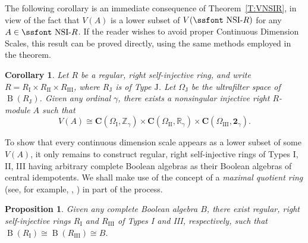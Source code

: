 \documentclass[psamsfonts,reqno]{memo-l}
\theoremstyle{plain}
\newtheorem{proposition}[lemma]{Proposition}
\newtheorem{corollary}[lemma]{Corollary}
\theoremstyle{definition}
\theoremstyle{remark}
\numberwithin{equation}{section}
\newcommand{\two}{\mathbf{2}}
\newcommand{\CC}{\mathbf{C}}
\DeclareMathOperator{\rB}{B}
\newcommand{\I}{\mathrm{I}}
\newcommand{\II}{\mathrm{II}}
\newcommand{\III}{\mathrm{III}}
\newcommand{\ZZ}{\mathbb{Z}}
\newcommand{\RR}{\mathbb{R}}
\newcommand{\J}{\mathrm{J}}
\newcommand{\NSIR}{\mbox{\ssfont NSI-}R}
\begin{document}
The following corollary is an immediate consequence of
Theorem~\ref{T:VNSIR}, in view of the fact that $V(A)$
is a lower subset of
$V(\NSIR)$ for any $A\in\NSIR$. If the reader wishes to avoid proper
Continuous Dimension Scales, this result can be proved directly, using
the same methods employed in the theorem.

\begin{corollary}\label{C:VNSIR}
Let $R$ be a regular, right self-injective ring,
%
and write $R= R_{\I}\times R_{\II}\times R_{\III}$, where $R_{\J}$ is of Type
$\J$. Let $\Omega_{\J}$ be the ultrafilter space of $\rB(R_{\J})$. Given any
ordinal $\gamma$, there exists a nonsingular injective right
$R$-module $A$ such that
\index{Zzzgamma@$\ZZ_\gamma$}\index{Rzzgamma@$\RR_\gamma$}%
\index{Tzzgamma@$\two_\gamma$}%
   \begin{equation}
   V(A)\cong \CC(\Omega_{\I},\ZZ_\gamma)\times
   \CC(\Omega_{\II},\RR_\gamma)\times
   \CC(\Omega_{\III},\two_\gamma).\tag*{\qed}
   \end{equation}
\renewcommand{\qed}{}
\end{corollary}

To show that every continuous dimension scale appears as a
lower subset of some $V(A)$, it only remains to
construct regular, right self-injective rings
%
of Types I, II, III having arbitrary complete
Boolean algebras
as their Boolean algebras of central idempotents.
We shall make use of the concept of a \emph{maximal quotient ring}
(see, for example, \cite[Chapter~2]{Gnonsing},
\cite[\S13]{Lam})
 in part of the process.

\begin{proposition}\label{P:existB(R)I,III}
Given any
complete Boolean algebra $B$, there exist regular, right
self-injective rings
%
$R_{\I}$ and $R_{\III}$ of Types I and III,
respectively, such that $\rB(R_{\I})\cong \rB(R_{\III})\cong B$.
\end{proposition}
\end{document}
